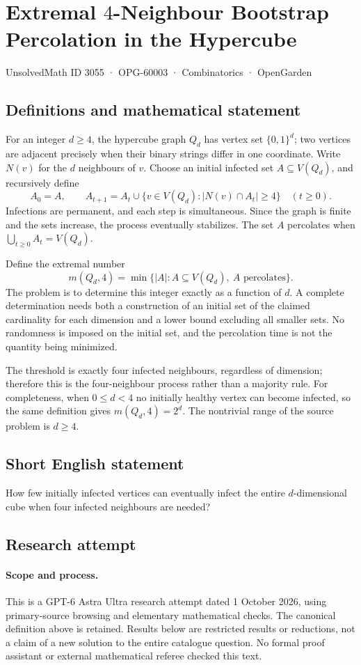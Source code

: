 \documentclass[11pt,a4paper]{article}
\begin{document}
\section*{Extremal $4$-Neighbour Bootstrap Percolation in the Hypercube}\label{3055}
{\small UnsolvedMath ID 3055 · OPG-60003 · Combinatorics · OpenGarden}
\subsection{Definitions and mathematical statement}
For an integer $d\ge4$, the hypercube graph $Q_d$ has vertex set
$\{0,1\}^d$; two vertices are adjacent precisely when their binary strings
differ in one coordinate. Write $N(v)$ for the $d$ neighbours of $v$.
Choose an initial infected set $A\subseteq V(Q_d)$, and recursively define
\[
 A_0=A,\qquad
 A_{t+1}=A_t\cup\{v\in V(Q_d):|N(v)\cap A_t|\ge4\}
 \quad(t\ge0).
\]
Infections are permanent, and each step is simultaneous. Since the graph
is finite and the sets increase, the process eventually stabilizes.
The set $A$ percolates when $\bigcup_{t\ge0}A_t=V(Q_d)$.

Define the extremal number
\[
 m(Q_d,4)=\min\{|A|:A\subseteq V(Q_d),\ A\text{ percolates}\}.
\]
The problem is to determine this integer exactly as a function of $d$.
A complete determination needs both a construction of an initial set of
the claimed cardinality for each dimension and a lower bound excluding
all smaller sets. No randomness is imposed on the initial set, and the
percolation time is not the quantity being minimized.

The threshold is exactly four infected neighbours, regardless of dimension;
therefore this is the four-neighbour process rather than a majority rule.
For completeness, when $0\le d<4$ no initially healthy vertex can become
infected, so the same definition gives $m(Q_d,4)=2^d$. The nontrivial range
of the source problem is $d\ge4$.
\subsection{Short English statement}
How few initially infected vertices can eventually infect the entire $d$-dimensional cube when four infected neighbours are needed?
\subsection{Research attempt}
\paragraph{Scope and process.}
This is a GPT-6 Astra Ultra research attempt dated 1 October 2026, using
primary-source browsing and elementary mathematical checks. The canonical
definition above is retained. Results below are restricted results or
reductions, not a claim of a new solution to the entire catalogue question.
No formal proof assistant or external mathematical referee checked this text.
\end{document}
